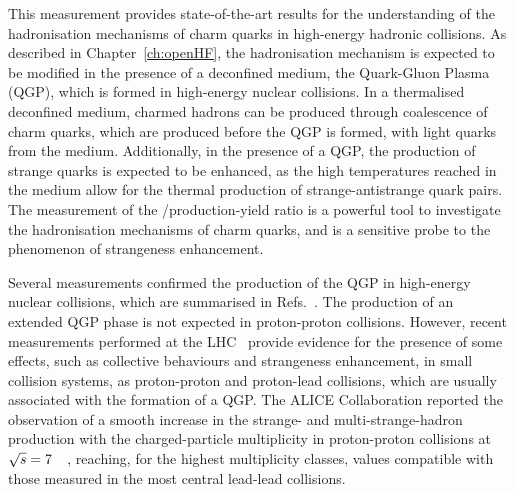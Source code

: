 This measurement provides state-of-the-art results for the understanding of the hadronisation mechanisms of charm quarks in high-energy hadronic collisions. As described in Chapter~\ref{ch:openHF}, the hadronisation mechanism is expected to be modified in the presence of a deconfined medium, the Quark-Gluon Plasma (QGP), which is formed in high-energy nuclear collisions. In a thermalised deconfined medium, charmed hadrons can be produced through coalescence of charm quarks, which are produced before the QGP is formed, with light quarks from the medium. Additionally, in the presence of a QGP, the production of strange quarks is expected to be enhanced, as the high temperatures reached in the medium allow for the thermal production of strange-antistrange quark pairs. The measurement of the \ds/\dpl production-yield ratio is a powerful tool to investigate the hadronisation mechanisms of charm quarks, and is a sensitive probe to the phenomenon of strangeness enhancement. 

Several measurements confirmed the production of the QGP in high-energy nuclear collisions, which are summarised in Refs.~\cite{ALICE:2022wpn,STAR:2005gfr,PHENIX:2004vcz}. The production of an extended QGP phase is not expected in proton-proton collisions. However, recent measurements performed at the LHC~\cite{CMS:2016fnw,CMS:2010ifv,ALICE:2019zfl} provide evidence for the presence of some effects, such as collective behaviours and strangeness enhancement, in small collision systems, as proton-proton and proton-lead collisions, which are usually associated with the formation of a QGP. The ALICE Collaboration reported the observation of a smooth increase in the strange- and multi-strange-hadron production with the charged-particle multiplicity in proton-proton collisions at $\sqrt{s}=7$~\tev~\cite{ALICE:2016fzo}, reaching, for the highest multiplicity classes, values compatible with those measured in the most central lead-lead collisions. 

